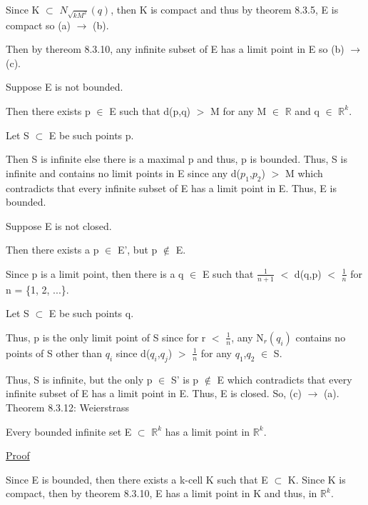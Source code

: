	Since K $\subset$ $N_{\sqrt{kM^2}}(q)$, then K is compact
	and thus by {\color{red} theorem 8.3.5}, E is compact
	so (a) $\rightarrow$ (b).

	Then by {\color{red} thereom 8.3.10}, any infinite subset
	of E has a limit point in E so (b) $\rightarrow$ (c).

	Suppose E is not bounded.

	Then there exists p $\in$ E such that d(p,q) $>$ M for
	any M $\in$ $\mathbb{R}$ and q $\in$ $\mathbb{R}^k$.

	Let S $\subset$ E be such points p.
	
	Then S is infinite else there is a maximal p and thus,
	p is bounded.
	Thus, S is infinite and contains no limit points in E
	since any d($p_1$,$p_2$) $>$ M which contradicts that
	every infinite subset of E has a limit point in E.
	Thus, E is bounded.

	Suppose E is not closed.

	Then there exists a p $\in$ E', but p $\not \in$ E.

	Since p is a limit point, then there is a
	q $\in$ E such that $\frac{1}{n+1}$ $<$ d(q,p) $<$ $\frac{1}{n}$
	for n = \{1, 2, ...\}.

	Let S $\subset$ E be such points q.

	Thus, p is the only limit point of S since for r $<$ $\frac{1}{n}$,
	any N$_r(q_i)$ contains no points of S other than $q_i$ since
	d($q_i$,$q_j$) $>$ $\frac{1}{n}$ for any $q_1$,$q_2$ $\in$ S.
	
	Thus, S is infinite, but the only p $\in$ S' is p $\not \in$ E
	which contradicts that every infinite subset of E has a
	limit point in E. Thus, E is closed. So, (c) $\rightarrow$ (a). \\

{ \color{red} Theorem 8.3.12: Weierstrass } 

	\begin{adjustbox}{minipage=14cm, right, vspace=0.1cm 0cm}
		Every bounded infinite set E $\subset$ $\mathbb{R}^k$ has
		a limit point in $\mathbb{R}^k$.
	\end{adjustbox}

{ \color{magenta} \underline{Proof} } 

	Since E is bounded, then there exists a k-cell K such that
	E $\subset$ K.
	Since K is compact, then by {\color{red} theorem 8.3.10},
	E has a limit point in K and thus, in $\mathbb{R}^k$.





